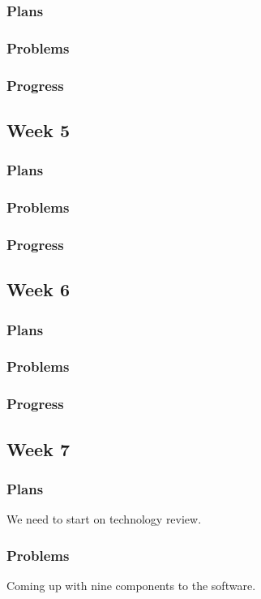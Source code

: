 \documentclass[onecolumn, draftclsnofoot, 10pt, compsoc]{IEEEtran}
\begin{document}
\subsubsection{Plans}
\subsubsection{Problems}
\subsubsection{Progress}

\subsection{Week 5}
\subsubsection{Plans}
\subsubsection{Problems}
\subsubsection{Progress}

\subsection{Week 6}
\subsubsection{Plans}
\subsubsection{Problems}
\subsubsection{Progress}

\subsection{Week 7}
\subsubsection{Plans}
We need to start on technology review.

\subsubsection{Problems}
Coming up with nine components to the software.
\end{document}
